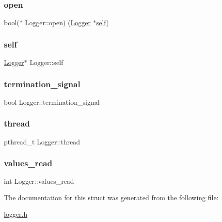 \subsubsection{\texorpdfstring{open}{open}}
{\footnotesize\ttfamily bool($\ast$ Logger\+::open) (\hyperlink{structLogger}{Logger} $\ast$\hyperlink{structLogger_a220cd94b89be365dba07df9cbdf2d15f}{self})}

\mbox{\label{structLogger_a220cd94b89be365dba07df9cbdf2d15f}} 
\subsubsection{\texorpdfstring{self}{self}}
{\footnotesize\ttfamily \hyperlink{structLogger}{Logger}$\ast$ Logger\+::self}

\mbox{\label{structLogger_af3c673bf2d3f729549722c0beab4f34c}} 
\subsubsection{\texorpdfstring{termination\+\_\+signal}{termination\_signal}}
{\footnotesize\ttfamily bool Logger\+::termination\+\_\+signal}

\mbox{\label{structLogger_a69e132f8b832286f2bfd777d0a6bc266}} 
\subsubsection{\texorpdfstring{thread}{thread}}
{\footnotesize\ttfamily pthread\+\_\+t Logger\+::thread}

\mbox{\label{structLogger_aa5a4930df402c7b25487a1315b9a94f4}} 
\subsubsection{\texorpdfstring{values\+\_\+read}{values\_read}}
{\footnotesize\ttfamily int Logger\+::values\+\_\+read}



The documentation for this struct was generated from the following file\+:\begin{DoxyCompactItemize}
\item 
\hyperlink{logger_8h}{logger.\+h}\end{DoxyCompactItemize}
